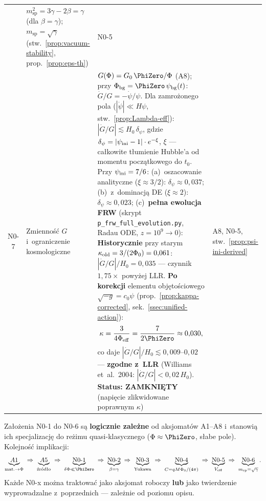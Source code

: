 \begin{center}
\begin{tabular}{@{}clp{7.5cm}l@{}}
  & $m_{\mathrm{sp}}^2 = 3\gamma - 2\beta = \gamma$
    (dla $\beta = \gamma$);
    $m_{\mathrm{sp}} = \sqrt{\gamma}$
    (stw.~\ref{prop:vacuum-stability}, prop.~\ref{prop:eps-th})
  & N0-5 \\[4pt]
N0-7
  & Zmienno\'s\'c $G$ i~ograniczenie kosmologiczne
  & $G(\Phi) = G_0\,\PhiZero/\Phi$ (A8);
    przy $\Phi_{\mathrm{bg}} = \PhiZero\,\psi_{\mathrm{bg}}(t)$:
    $\dot{G}/G = -\dot\psi/\psi$.
    Dla zamro\.zonego pola ($|\dot\psi| \ll H\psi$, stw.~\ref{prop:Lambda-eff}):
    $|\dot{G}/G| \lesssim H_0\,\delta_\psi$,
    gdzie $\delta_\psi = |\psi_{\rm ini} - 1|\cdot e^{-\xi}$,
    $\xi$ --- ca\l{}kowite t\l{}umienie Hubble'a
    od momentu pocz\k{a}tkowego do $t_0$.
    Przy $\psi_{\rm ini} = 7/6$:
    (a)~oszacowanie analityczne ($\xi \approx 3/2$):
    $\delta_\psi \approx 0{,}037$;
    (b)~z~dominacj\k{a} DE ($\xi \approx 2$):
    $\delta_\psi \approx 0{,}023$;
    (c)~\textbf{pe\l{}na ewolucja FRW} (skrypt \texttt{p\_frw\_full\_evolution.py},
    Radau ODE, $z = 10^9 \to 0$):
    \textbf{Historycznie} przy starym $\kappa_{\rm old} = 3/(2\Phi_0) = 0{,}061$:
    $|\dot{G}/G|/H_0 = 0{,}035$ --- czynnik $1{,}75\times$ powy\.zej LLR.
    \textbf{Po korekcji} elementu obj\k{e}to\'sciowego
    $\sqrt{-g} = c_0\psi$ (prop.~\ref{prop:kappa-corrected},
    sek.~\ref{ssec:unified-action}):
    \begin{equation*}
      \kappa = \frac{3}{4\Phi_{\rm eff}} = \frac{7}{2\PhiZero} \approx 0{,}030,
    \end{equation*}
    co daje $|\dot{G}/G|/H_0 \lesssim 0{,}009$--$0{,}02$
    --- \textbf{zgodne z~LLR} (Williams et~al.\ 2004:
    $|\dot{G}/G| < 0{,}02\,H_0$).
    \textbf{Status: ZAMKNI\k{E}TY} (napi\k{e}cie zlikwidowane
    poprawnym $\kappa$)
  & A8, N0-5, stw.~\ref{prop:psi-ini-derived} \\
\bottomrule
\end{tabular}
\end{center}

\begin{remark}
Za\l{}o\.zenia N0-1 do N0-6 s\k{a} \textbf{logi\-cznie zale\.zne}
od aksjomat\'ow A1--A8 i~stanowi\k{a} ich spe\-cjali\-zacj\k{e}
do re\.zimu quasi-klasycznego ($\Phi \approx \PhiZero$, s\l{}abe pole).
Kolejno\'s\'c implikacji:
\begin{equation*}
  \underbrace{A1}_{\text{mat.}\to\Phi}
  \;\Rightarrow\;
  \underbrace{A5}_{\text{\'zr\'od\l{}o}}
  \;\Rightarrow\;
  \underbrace{\text{N0-1}}_{\delta\Phi\ll\PhiZero}
  \;\Rightarrow\;
  \underbrace{\text{N0-2}}_{\beta=\gamma}
  \;\Rightarrow\;
  \underbrace{\text{N0-3}}_{\text{Yukawa}}
  \;\Rightarrow\;
  \underbrace{\text{N0-4}}_{C=qM\Phi_0/(4\pi)}
  \;\Rightarrow\;
  \underbrace{\text{N0-5}}_{V_{\mathrm{eff}}}
  \;\Rightarrow\;
  \underbrace{\text{N0-6}}_{m_{\mathrm{sp}}=\sqrt{\gamma}}.
\end{equation*}
Ka\.zde N0-x mo\.zna traktowa\'c jako aksjomat roboczy \textbf{lub} jako
twierdzenie wyprowadzalne z~poprzednich --- zale\.znie od poziomu opisu.
\end{remark}

